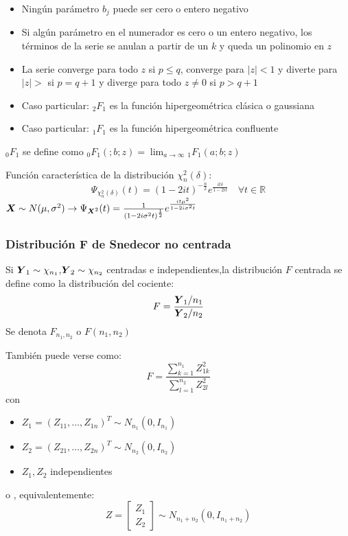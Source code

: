 \begin{nota}
  \begin{itemize}
  \item Ningún parámetro $b_j$ puede ser cero o entero negativo
  \item Si algún parámetro en el numerador es cero o un entero negativo, los términos de la serie se anulan a partir de un $k$ y queda un polinomio en $z$
  \item La serie converge para todo $z$ si $p \leq q$, converge para $|z| < 1$ y diverte para $|z|> $ si $p = q+1$ y diverge para todo $z\ne 0$ si $p>q+1$

  \item Caso particular: ${}_2F_1$ es la función hipergeométrica clásica o gaussiana
    \item Caso particular: ${}_1F_1$ es la función hipergeométrica confluente
  \end{itemize}
  \item ${}_0F_1$ se define como ${}_0F_1(;b;z) = \lim_{a\to \infty} {}_1F_1(a;b;z)$
\end{nota}


Función característica de la distribución $\chi_n^2(\delta)$:
\[
\Psi_{\chi_n^2(\delta)}(t) = (1-2it)^{-\frac{n}{2}} e^{\frac{it\delta}{1-2it}} \quad \forall t \in \mathbb R
\]
$\boldsymbol{X} \sim N(\mu,\sigma^2) \to \Psi_{\boldsymbol{X}^2}(t) = \frac{1}{(1-2i\sigma^2 t)^{\frac{1}{2}}} e^{\frac{it\mu^2}{1-2i\sigma^2 t}}$




\subsubsection{Distribución \texorpdfstring{$\boldsymbol F$}{F} de Snedecor no centrada}

\begin{ndef}
  Si $\boldsymbol{Y}_1\sim \chi_{n_1}$,$\boldsymbol{Y}_2 \sim \chi_{n_2}$ centradas e independientes,la distribución $F$ centrada se define como la distribución del cociente:
  \[
  F = \frac{\boldsymbol{Y}_1 / n_1}{\boldsymbol{Y}_2 / n_2}
  \]
  Se denota $F_{n_1,n_2}$ o $F(n_1,n_2)$
\end{ndef}
También puede verse como:
\[
F = \frac{\sum_{k=1}^{n_1} Z_{1k}^2}{\sum_{l=1}^{n_2} Z_{2l}^2}
\]
con
\begin{itemize}
\item $Z_1 = (Z_{11},\dots, Z_{1n})^T \sim N_{n_1}(0,I_{n_1})$
\item $Z_2 = (Z_{21},\dots, Z_{2n})^T \sim N_{n_2}(0,I_{n_2})$
  \item $Z_1,Z_2$ independientes
\end{itemize}
o , equivalentemente:
\[
Z = \begin{bmatrix}Z_1 \\ Z_2 \end{bmatrix} \sim N_{n_1+n_2}(0,I_{n_1+n_2})
\]

